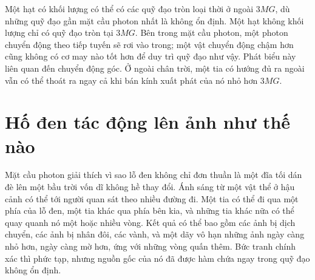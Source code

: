 \begin{classroomqa}
\end{classroomqa}

\begin{classroomqa}
\end{classroomqa}

Một hạt có khối lượng có thể có các quỹ đạo tròn loại thời ở ngoài \(3MG\), dù những quỹ đạo gần mặt cầu photon nhất là không ổn định. Một hạt không khối lượng chỉ có quỹ đạo tròn tại \(3MG\). Bên trong mặt cầu photon, một photon chuyển động theo tiếp tuyến sẽ rơi vào trong; một vật chuyển động chậm hơn cũng không có cơ may nào tốt hơn để duy trì quỹ đạo như vậy. Phát biểu này liên quan đến chuyển động góc. Ở ngoài chân trời, một tia có hướng đủ ra ngoài vẫn có thể thoát ra ngay cả khi bán kính xuất phát của nó nhỏ hơn \(3MG\).

\section{Hố đen tác động lên ảnh như thế nào}

Mặt cầu photon giải thích vì sao lỗ đen không chỉ đơn thuần là một đĩa tối dán đè lên một bầu trời vốn dĩ không hề thay đổi. Ánh sáng từ một vật thể ở hậu cảnh có thể tới người quan sát theo nhiều đường đi. Một tia có thể đi qua một phía của lỗ đen, một tia khác qua phía bên kia, và những tia khác nữa có thể quay quanh nó một hoặc nhiều vòng. Kết quả có thể bao gồm các ảnh bị dịch chuyển, các ảnh bị nhân đôi, các vành, và một dãy vô hạn những ảnh ngày càng nhỏ hơn, ngày càng mờ hơn, ứng với những vòng quấn thêm. Bức tranh chính xác thì phức tạp, nhưng nguồn gốc của nó đã được hàm chứa ngay trong quỹ đạo không ổn định.

